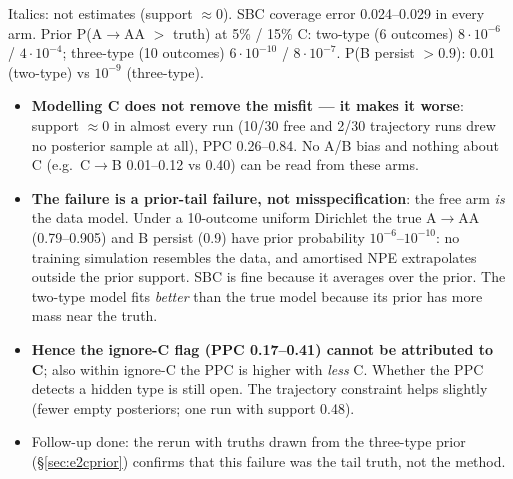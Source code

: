 \documentclass[10pt,a4paper]{article}
\newcommand{\blk}[1]{\par\needspace{5\baselineskip}\smallskip{\sffamily\bfseries\color{inkgray}#1}\par}
\newcommand{\Comment}{\blk{Comment}}
\begin{document}
Italics: not estimates (support $\approx 0$). SBC coverage error 0.024--0.029 in every arm. Prior P(A$\to$AA $>$ truth) at 5\% / 15\% C: two-type (6 outcomes) $8\cdot10^{-6}$ / $4\cdot10^{-4}$; three-type (10 outcomes) $6\cdot10^{-10}$ / $8\cdot10^{-7}$. P(B persist $>0.9$): 0.01 (two-type) vs $10^{-9}$ (three-type).
\Comment
\begin{itemize}
\item \textbf{Modelling C does not remove the misfit --- it makes it worse}: support $\approx 0$ in almost every run (10/30 free and 2/30 trajectory runs drew no posterior sample at all), PPC 0.26--0.84. No A/B bias and nothing about C (e.g.\ C$\to$B 0.01--0.12 vs 0.40) can be read from these arms.
\item \textbf{The failure is a prior-tail failure, not misspecification}: the free arm \emph{is} the data model. Under a 10-outcome uniform Dirichlet the true A$\to$AA (0.79--0.905) and B persist (0.9) have prior probability $10^{-6}$--$10^{-10}$: no training simulation resembles the data, and amortised NPE extrapolates outside the prior support. SBC is fine because it averages over the prior. The two-type model fits \emph{better} than the true model because its prior has more mass near the truth.
\item \textbf{Hence the ignore-C flag (PPC 0.17--0.41) cannot be attributed to C}; also within ignore-C the PPC is higher with \emph{less} C. Whether the PPC detects a hidden type is still open. The trajectory constraint helps slightly (fewer empty posteriors; one run with support 0.48).
\item Follow-up done: the rerun with truths drawn from the three-type prior (\S\ref{sec:e2cprior}) confirms that this failure was the tail truth, not the method.
\end{itemize}

\end{document}
